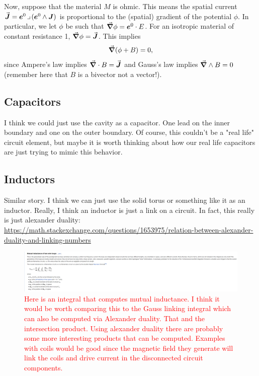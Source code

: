 \documentclass{article}
\begin{document}
Now, suppose that the material $M$ is ohmic. This means the spatial current $\vec{\boldsymbol{J}}=\boldsymbol{e}^0\hspace*{.5mm}\lrcorner \hspace*{.5mm} (\boldsymbol{e}^0 \wedge \boldsymbol{J})$ is proportional to the (spatial) gradient of the potential $\phi$. In particular, we let $\phi$ be such that $\vec{\boldsymbol{\nabla}}\phi = \boldsymbol{e}^0 \cdot E$. For an isotropic material of constant resistance 1, $\vec{\boldsymbol{\nabla}} \phi = \vec{\boldsymbol{J}}$. This implies
\begin{equation}
    \vec{\boldsymbol{\nabla}} (\phi + B) = 0,
\end{equation}
since Ampere's law implies $\vec{\boldsymbol{\nabla}} \cdot B = \vec{\boldsymbol{J}}$ and Gauss's law implies $\vec{\boldsymbol{\nabla}} \wedge B = 0$ (remember here that $B$ is a bivector not a vector!).

\subsection{Capacitors}
I think we could just use the cavity as a capacitor. One lead on the inner boundary and one on the outer boundary. Of course, this couldn't be a "real life" circuit element, but maybe it is worth thinking about how our real life capacitors are just trying to mimic this behavior.

\subsection{Inductors}
Similar story. I think we can just use the solid torus or something like it as an inductor. Really, I think an inductor is just a link on a circuit. In fact, this really is just alexander duality: \url{https://math.stackexchange.com/questions/1653975/relation-between-alexander-duality-and-linking-numbers}

\begin{figure}[H]
    \centering
    \includegraphics[width=\textwidth]{figures/mutual_inductance.png}
    \caption{\textcolor{red}{Here is an integral that computes mutual inductance. I think it would be worth comparing this to the Gauss linking integral which can also be computed via Alexander duality. That and the intersection product. Using alexander duality there are probably some more interesting products that can be computed. Examples with coils would be good since the magnetic field they generate will link the coils and drive current in the disconnected circuit components.}}
\end{figure}
\end{document}
